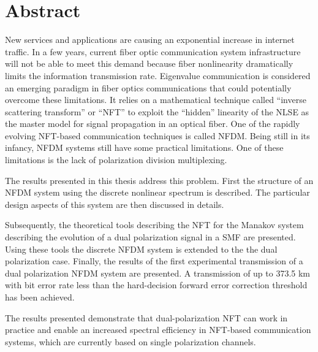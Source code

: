\chapter{Abstract}



New services and applications are causing an exponential increase in internet traffic.  In a few years, current fiber optic communication system infrastructure will not be able to meet this demand because fiber nonlinearity dramatically limits the information transmission rate. Eigenvalue communication is considered an emerging paradigm in fiber optics communications that could potentially overcome these limitations. It relies on a mathematical technique called ``inverse scattering transform'' or ``\ac{NFT}'' to exploit the ``hidden'' linearity of the \acl{NLSE} as the master model for signal propagation in an optical fiber.
One of the rapidly evolving \ac{NFT}-based communication techniques is called \ac{NFDM}.
Being still in its infancy, \ac{NFDM} systems still have some practical limitations. One of these limitations is the lack of polarization division multiplexing.

The results presented in this thesis address this problem.
First the structure of an \ac{NFDM} system using the discrete nonlinear spectrum is described. The particular design aspects of this system are then discussed in details.

Subsequently, the theoretical tools describing the NFT for the Manakov system describing the evolution of a dual polarization signal in a \acl{SMF}  are presented. Using these tools the discrete \ac{NFDM} system is extended to the the dual polarization case.
Finally, the results of the first experimental transmission of a dual polarization \ac{NFDM} system are presented. A transmission of up to 373.5 km with bit error rate less than the hard-decision forward error correction threshold has been achieved.

The results presented demonstrate that dual-polarization \ac{NFT} can work in practice and enable an increased spectral efficiency in \ac{NFT}-based communication systems, which are currently based on single polarization channels.

